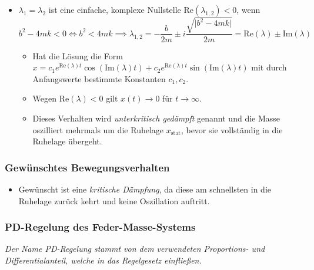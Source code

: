 \documentclass[a4paper, 11pt, accentcolor = tud3b]{tudreport}
\providecommand{\abs}[1]{\ensuremath{{\lvert #1 \rvert}}}
\renewcommand{\Re}{\text{Re}}
\renewcommand{\Im}{\text{Im}}
\begin{document}
\begin{itemize}
\begin{itemize}
							\end{itemize}
						\item \( \lambda _ 1 = \lambda _ 2 \) ist eine einfache, komplexe Nullstelle \( \Re(\lambda _ {1,2}) < 0 \), wenn
							\begin{equation*}
								b ^ 2 - 4mk < 0 \iff b ^ 2 < 4mk \implies \lambda _ { 1, 2 } = -\frac{b}{2m} \pm i \frac{\sqrt{\abs{b^2 - 4mk}}}{2m} = \Re(\lambda) \pm \Im(\lambda)
							\end{equation*}
							\begin{itemize}
								\item Hat die Lösung die Form \( x = c_1 e ^ { \Re(\lambda) t } \cos(\Im(\lambda) t) + c_2 e ^ { \Re(\lambda) t } \sin(\Im(\lambda) t) \) mit durch Anfangswerte bestimmte Konstanten \( c _ 1, c _ 2 \).
								\item Wegen \( \Re(\lambda) < 0 \) gilt \( x(t) \rightarrow 0 \) für \( t \rightarrow \infty \).
								\item Dieses Verhalten wird \textit{unterkritisch gedämpft} genannt und die Masse oszilliert mehrmals um die Ruhelage \( x _ \text{stat} \), bevor sie vollständig in die Ruhelage übergeht.
							\end{itemize}
					\end{itemize}
				
				\subsubsection{Gewünschtes Bewegungsverhalten} %
					\begin{itemize}
						\item Gewünscht ist eine \textit{kritische Dämpfung}, da diese am schnellsten in die Ruhelage zurück kehrt und keine Oszillation auftritt.
					\end{itemize}
				
				\subsubsection{PD-Regelung des Feder-Masse-Systems} %
					\textit{Der Name PD-Regelung stammt von dem verwendeten Proportions- und Differentialanteil, welche in das Regelgesetz einfließen.}
				
\end{document}
